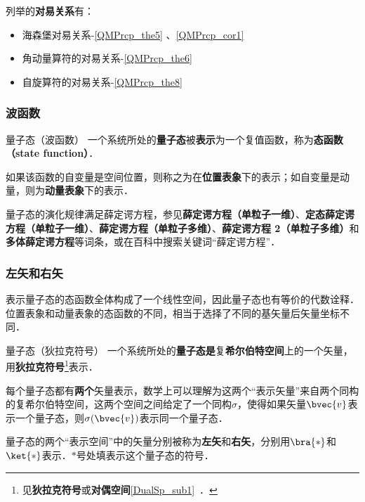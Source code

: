 列举的\textbf{对易关系}有：

\begin{itemize}
\item 海森堡对易关系-\autoref{QMPrcp_the5} 、\autoref{QMPrcp_cor1} 
\item 角动量算符的对易关系-\autoref{QMPrcp_the6} 
\item 自旋算符的对易关系-\autoref{QMPrcp_the8}  
\end{itemize}



\subsubsection{波函数}

\begin{definition}{量子态（波函数）}\label{QMPrcp_def6}
一个系统所处的\textbf{量子态}被\textbf{表示}为一个复值函数，称为\textbf{态函数（state function）}．

如果该函数的自变量是空间位置，则称之为在\textbf{位置表象}下的表示；如自变量是动量，则为\textbf{动量表象}下的表示．
\end{definition}

量子态的演化规律满足薛定谔方程，参见\textbf{薛定谔方程（单粒子一维）}、\textbf{定态薛定谔方程（单粒子一维）}、\textbf{薛定谔方程（单粒子多维）}、\textbf{薛定谔方程 2（单粒子多维）}和\textbf{多体薛定谔方程}等词条，或在百科中搜索关键词“薛定谔方程”．

\subsubsection{左矢和右矢}

表示量子态的态函数全体构成了一个线性空间，因此量子态也有等价的代数诠释．位置表象和动量表象的态函数的不同，相当于选择了不同的基矢量后矢量坐标不同．

\begin{definition}{量子态（狄拉克符号）}\label{QMPrcp_def4}
一个系统所处的\textbf{量子态}\textbf{是}复\textbf{希尔伯特空间}上的一个矢量，用\textbf{狄拉克符号}\footnote{见\textbf{狄拉克符号}或\textbf{对偶空间}\autoref{DualSp_sub1}~．}表示．

每个量子态都有\textbf{两个}矢量表示，数学上可以理解为这两个“表示矢量”来自两个同构的复希尔伯特空间，这两个空间之间给定了一个同构$\sigma$，使得如果矢量$\bvec{v}$表示一个量子态，则$\sigma(\bvec{v})$表示同一个量子态．

量子态的两个“表示空间”中的矢量分别被称为\textbf{左矢}和\textbf{右矢}，分别用$\bra{*}$和$\ket{*}$表示．$*$号处填表示这个量子态的符号．

\end{definition}

